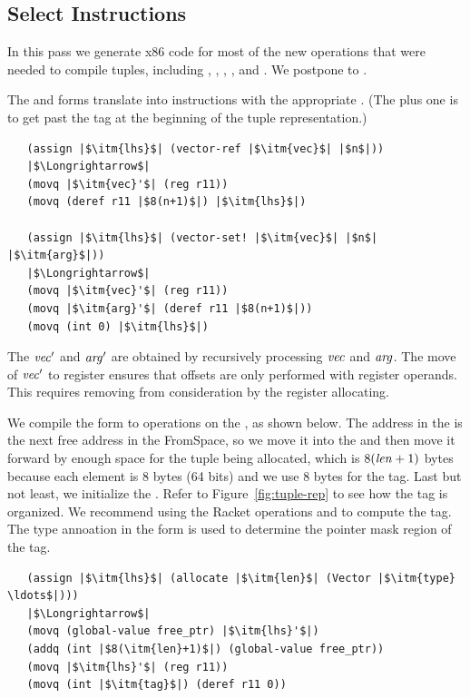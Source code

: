 \documentclass[11pt]{book}
\begin{document}
\clearpage

\subsection{Select Instructions}
\label{sec:select-instructions-gc}


In this pass we generate x86 code for most of the new operations that
were needed to compile tuples, including ,
, , , and
. We postpone  to .

The  and  forms translate into
 instructions with the appropriate .  (The
plus one is to get past the tag at the beginning of the tuple
representation.)
\begin{lstlisting}
   (assign |$\itm{lhs}$| (vector-ref |$\itm{vec}$| |$n$|))
   |$\Longrightarrow$|
   (movq |$\itm{vec}'$| (reg r11))
   (movq (deref r11 |$8(n+1)$|) |$\itm{lhs}$|)

   (assign |$\itm{lhs}$| (vector-set! |$\itm{vec}$| |$n$| |$\itm{arg}$|))
   |$\Longrightarrow$|
   (movq |$\itm{vec}'$| (reg r11))
   (movq |$\itm{arg}'$| (deref r11 |$8(n+1)$|))
   (movq (int 0) |$\itm{lhs}$|)
\end{lstlisting}
The $\mathit{vec}'$ and $\mathit{arg}'$ are obtained by recursively
processing $\mathit{vec}$ and $\mathit{arg}$.  The move of $\mathit{vec}'$ to
register  ensures that offsets are only performed with
register operands. This requires removing  from
consideration by the register allocating.

We compile the  form to operations on the
, as shown below. The address in the 
is the next free address in the FromSpace, so we move it into the
 and then move it forward by enough space for the tuple being
allocated, which is $8(\mathit{len}+1)$ bytes because each element is 8
bytes (64 bits) and we use 8 bytes for the tag. Last but not least, we
initialize the . Refer to Figure~\ref{fig:tuple-rep} to see
how the tag is organized. We recommend using the Racket operations
 and  to compute the tag.
The type annoation in the  form is used to determine the
pointer mask region of the tag.
\begin{lstlisting}
   (assign |$\itm{lhs}$| (allocate |$\itm{len}$| (Vector |$\itm{type} \ldots$|)))
   |$\Longrightarrow$|
   (movq (global-value free_ptr) |$\itm{lhs}'$|)
   (addq (int |$8(\itm{len}+1)$|) (global-value free_ptr))
   (movq |$\itm{lhs}'$| (reg r11))
   (movq (int |$\itm{tag}$|) (deref r11 0))
\end{lstlisting}
\end{document}
